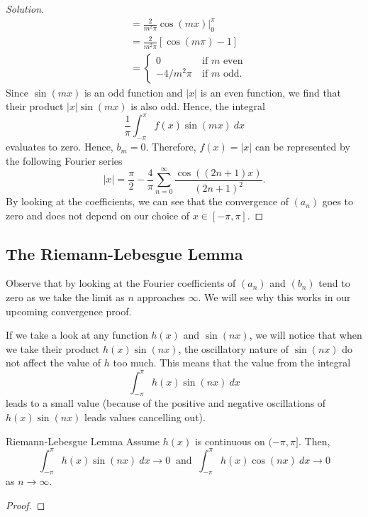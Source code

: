 \begin{enumerate}
\begin{proof}[Solution]
\begin{align*}
                      &=  \frac{ 2 }{ m^{2}\pi  }  \cos(mx) \Big|_{0}^{\pi} \\ 
                      &= \frac{ 2 }{ m^{2} \pi  } [ \cos(m \pi) - 1 ] \\
                      &= 
                      \begin{cases}
                          0 \ &\text{if } m \text{ even} \\
                          -4/ m^{2}\pi \ &\text{if } m  \text{ odd}.
                      \end{cases}
            \end{align*}
            Since \( \sin(mx)  \) is an odd function and \( | x  |  \) is an even function, we find that their product \( | x |  \sin(mx)  \) is also odd. Hence, the integral 
            \[ \frac{ 1 }{ \pi  }  \int_{ -\pi }^{ \pi   } f(x) \sin(mx)   \ dx  \]
            evaluates to zero. Hence, \( b_{m} = 0  \). Therefore, \( f(x) = | x  |  \) can be represented by the following Fourier series
            \[  | x |  = \frac{ \pi  }{ 2 }  - \frac{ 4  }{ \pi  }  \sum_{ n=0  }^{ \infty  } \frac{ \cos((2n+1)x)  }{ (2n+1)^{2}  }.  \] By looking at the coefficients, we can see that the convergence of \( (a_{n}) \) goes to zero and does not depend on our choice of \( x \in [-\pi , \pi ] \).
        \end{proof}
\end{enumerate}

\subsection{The Riemann-Lebesgue Lemma}

Observe that by looking at the Fourier coefficients of \( (a_{n}) \) and \( (b_{n}) \) tend to zero as we take the limit as \( n  \) approaches \( \infty  \). We will see why this works in our upcoming convergence proof.

If we take a look at any function \( h(x)  \) and \( \sin(nx) \), we will notice that when we take their product \( h(x) \sin(nx) \), the oscillatory nature of \( \sin(nx) \) do not affect the value of \( h  \) too much. This means that the value from the integral 
\[  \int_{ - \pi  }^{ \pi  } h(x) \sin(nx)  \ dx \] 
leads to a small value (because of the positive and negative oscillations of \( h(x) \sin(nx) \) leads values cancelling out).

\begin{theorem}{Riemann-Lebesgue Lemma}{}
    Assume \( h(x)  \) is continuous on \( (-\pi , \pi]  \). Then, 
    \[  \int_{ -\pi  }^{ \pi  } h(x) \sin(nx) \ dx \to 0 \ \text{ and } \ \int_{ -\pi  }^{ \pi  } h(x) \cos(nx)  \ dx \to 0 \]
    as \( n \to \infty  \).
\end{theorem}

\begin{proof}

\end{proof}






